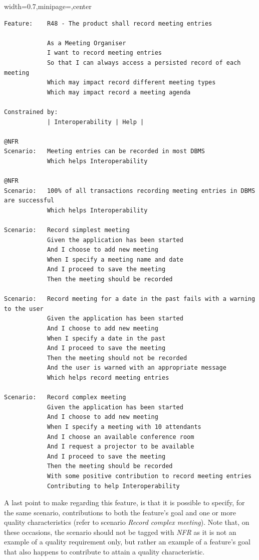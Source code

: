 \documentclass[dissertation,final]{softeng}
\newenvironment{featurecode}[1]
{ \lrbox\featurebox \begin{adjustbox}{width=#1\textwidth,minipage=\textwidth,center} }
{ \end{adjustbox}\endlrbox}
\newenvironment{featurelist}[2]
{
\newcommand{\setcaption}{\caption{#1}}
\newcommand{\setlabel}{\label{#2}}
}
{\begin{listing}[h!]\centering\usebox\featurebox\setcaption\setlabel\end{listing}}
\begin{document}
\begin{featurelist}{Changes to Gherkin -- Complete 48 feature}{lst:gherkin_changes_complete}
\begin{featurecode}{0.7}
\begin{verbatim}
Feature:    R48 - The product shall record meeting entries

            As a Meeting Organiser
            I want to record meeting entries
            So that I can always access a persisted record of each meeting
            Which may impact record different meeting types
            Which may impact record a meeting agenda
	
Constrained by:
            | Interoperability | Help |

@NFR
Scenario:   Meeting entries can be recorded in most DBMS
            Which helps Interoperability

@NFR	
Scenario:   100% of all transactions recording meeting entries in DBMS are successful
            Which helps Interoperability
	
Scenario:   Record simplest meeting
            Given the application has been started
            And I choose to add new meeting
            When I specify a meeting name and date
            And I proceed to save the meeting
            Then the meeting should be recorded
	
Scenario:   Record meeting for a date in the past fails with a warning to the user
            Given the application has been started
            And I choose to add new meeting
            When I specify a date in the past
            And I proceed to save the meeting
            Then the meeting should not be recorded
            And the user is warned with an appropriate message
            Which helps record meeting entries

Scenario:   Record complex meeting
            Given the application has been started
            And I choose to add new meeting
            When I specify a meeting with 10 attendants
            And I choose an available conference room
            And I request a projector to be available
            And I proceed to save the meeting
            Then the meeting should be recorded
            With some positive contribution to record meeting entries
            Contributing to help Interoperability
\end{verbatim}
\end{featurecode}
\end{featurelist}

A last point to make regarding this feature, is that it is possible to specify, for the same scenario, contributions to both the feature's goal and one or more quality characteristics (refer to scenario \emph{Record complex meeting}). Note that, on these occasions, the scenario should not be tagged with \emph{NFR} as it is not an example of a quality requirement only, but rather an example of a feature's goal that also happens to contribute to attain a quality characteristic.
\end{document}
